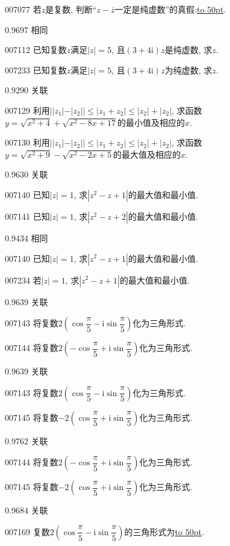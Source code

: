 \documentclass[10pt,a4paper]{article}
\newcommand{\blank}[1]{\underline{\hbox to #1pt{}}}
\begin{document}
007077	若$z$是复数, 判断``$z-\overline z$一定是纯虚数''的真假:\blank{50}.



0.9697 相同

007112	已知复数$z$满足$|z|=5$, 且$(3+4\mathrm{i})z$是纯虚数, 求$z$.

007233	已知复数$z$满足$|z|=5$, 且$(3+4\mathrm{i})z$为纯虚数, 求$z$.



0.9290 关联

007129	利用$||z_1|-|z_2||\le|z_1+z_2|\le|z_2|+|z_2|$, 求函数$y=\sqrt {x^2+4}+\sqrt {x^2-8x+17}$的最小值及相应的$x$.

007130	利用$||z_1|-|z_2||\le|z_1+z_2|\le|z_2|+|z_2|$, 求函数$y=\sqrt {x^2+9}-\sqrt {x^2-2x+5}$的最大值及相应的$x$.



0.9630 关联

007140	已知$|z|=1$, 求$|z^2-z+1|$的最大值和最小值.

007141	已知$|z|=1$, 求$|z^2-z+2|$的最大值和最小值.



0.9434 相同

007140	已知$|z|=1$, 求$|z^2-z+1|$的最大值和最小值.

007234	若$|z|=1$, 求$|z^2-z+1|$的最大值和最小值.



0.9639 关联

007143	将复数$2(\cos \dfrac{\pi }5-\mathrm{i}\sin \dfrac{\pi }5)$化为三角形式.

007144	将复数$2(-\cos \dfrac{\pi }5+\mathrm{i}\sin \dfrac{\pi }5)$化为三角形式.



0.9639 关联

007143	将复数$2(\cos \dfrac{\pi }5-\mathrm{i}\sin \dfrac{\pi }5)$化为三角形式.

007145	将复数$-2(\cos \dfrac{\pi }5+\mathrm{i}\sin \dfrac{\pi }5)$化为三角形式.



0.9762 关联

007144	将复数$2(-\cos \dfrac{\pi }5+\mathrm{i}\sin \dfrac{\pi }5)$化为三角形式.

007145	将复数$-2(\cos \dfrac{\pi }5+\mathrm{i}\sin \dfrac{\pi }5)$化为三角形式.



0.9684 关联

007169	复数$2(\cos \dfrac{\pi }5-\mathrm{i}\sin \dfrac{\pi }5)$的三角形式为\blank{50}.
\end{document}
